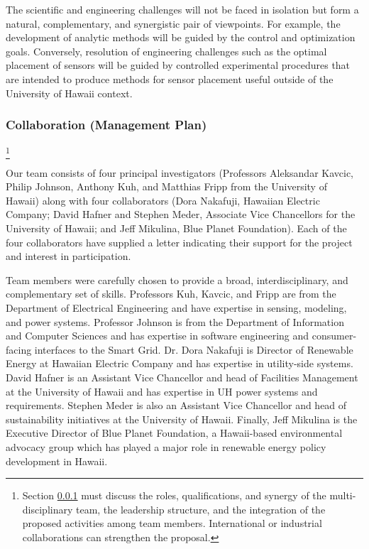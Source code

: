 The scientific and engineering challenges will not be faced in isolation
but form a natural, complementary, and synergistic pair of viewpoints. For
example, the development of analytic methods will be guided by the control
and optimization goals.  Conversely, resolution of engineering challenges
such as the optimal placement of sensors will be guided by controlled
experimental procedures that are intended to produce methods for sensor
placement useful outside of the University of Hawaii context.

\subsubsection{Collaboration (Management Plan)}
\label{sec:collaboration}

\footnote{Section \ref{sec:collaboration} must discuss the roles, qualifications, and
  synergy of the multi-disciplinary team, the leadership structure, and the
  integration of the proposed activities among team members.  
  International or industrial collaborations can strengthen the proposal.
}

Our team consists of four principal investigators (Professors Aleksandar
Kavcic, Philip Johnson, Anthony Kuh, and Matthias Fripp from the University
of Hawaii) along with four collaborators (Dora Nakafuji, Hawaiian Electric
Company; David Hafner and Stephen Meder, Associate Vice Chancellors for the
University of Hawaii; and Jeff Mikulina, Blue Planet Foundation).  Each of
the four collaborators have supplied a letter indicating their support for
the project and interest in participation.

Team members were carefully chosen to provide a broad, interdisciplinary,
and complementary set of skills. Professors Kuh, Kavcic, and Fripp are from
the Department of Electrical Engineering and have expertise in sensing,
modeling, and power systems.  Professor Johnson is from the Department of
Information and Computer Sciences and has expertise in software engineering
and consumer-facing interfaces to the Smart Grid.  Dr. Dora Nakafuji is
Director of Renewable Energy at Hawaiian Electric Company and has expertise
in utility-side systems. David Hafner is an Assistant Vice Chancellor and
head of Facilities Management at the University of Hawaii and has expertise
in UH power systems and requirements.  Stephen Meder is also an Assistant
Vice Chancellor and head of sustainability initiatives at the University of
Hawaii.  Finally, Jeff Mikulina is the Executive Director of Blue Planet
Foundation, a Hawaii-based environmental advocacy group which has played a
major role in renewable energy policy development in Hawaii.

